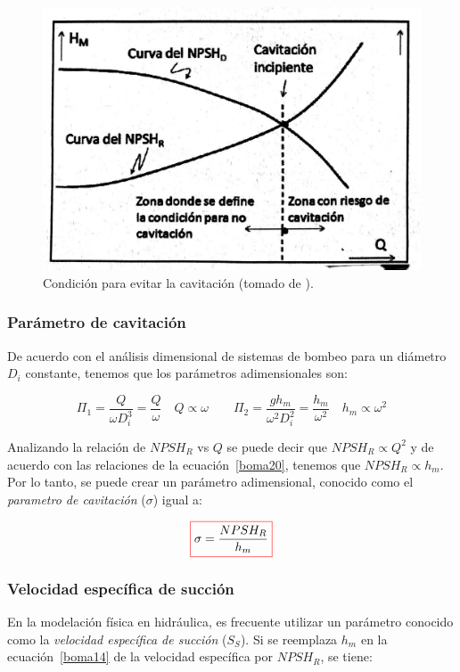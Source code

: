 \documentclass[11pt, oneside]{article}
\begin{document}
\begin{figure}[h]
\centering
\includegraphics[width=12cm]{./figs/bom21.jpeg}
\caption{Condici\'on para evitar la cavitaci\'on (tomado de \cite{agudelo2011mecanica}).} 
\label{bom21}
\end{figure}

\subsubsection*{Par\'ametro de cavitaci\'on}
De acuerdo con el an\'alisis dimensional de sistemas de bombeo para un di\'ametro $D_i$ constante, tenemos que los par\'ametros adimensionales son:

\begin{equation}
\Pi_1 = \frac{Q}{\omega D_i^3} = \frac{Q}{\omega} \quad Q \propto \omega  \quad \quad \Pi_2 = \frac{g h_m}{\omega^2 D_i^2} = \frac{h_m}{\omega^2} \quad h_m \propto \omega^2
\label{boma20}
\end{equation}

Analizando la relaci\'on de $NPSH_R$ vs $Q$ se puede decir que $NPSH_R \propto Q^2$ y de acuerdo con las relaciones de la ecuaci\'on~\ref{boma20}, tenemos que $NPSH_R \propto h_m$. Por lo tanto, se puede crear un par\'ametro adimensional, conocido como el \emph{parametro de cavitaci\'on} ($\sigma$) igual a:

\begin{equation}
\color{red}\boxed{\color{black} \sigma = \frac{NPSH_R}{h_m} }
\label{boma21}
\end{equation}


\subsubsection*{Velocidad espec\'ifica de succi\'on}
En la modelaci\'on f\'isica en hidr\'aulica, es frecuente utilizar un par\'ametro conocido como la \emph{velocidad espec\'ifica de succi\'on} ($S_S$). Si se reemplaza $h_m$ en la ecuaci\'on~\ref{boma14} de la velocidad espec\'ifica por $NPSH_R$, se tiene:
\end{document}
